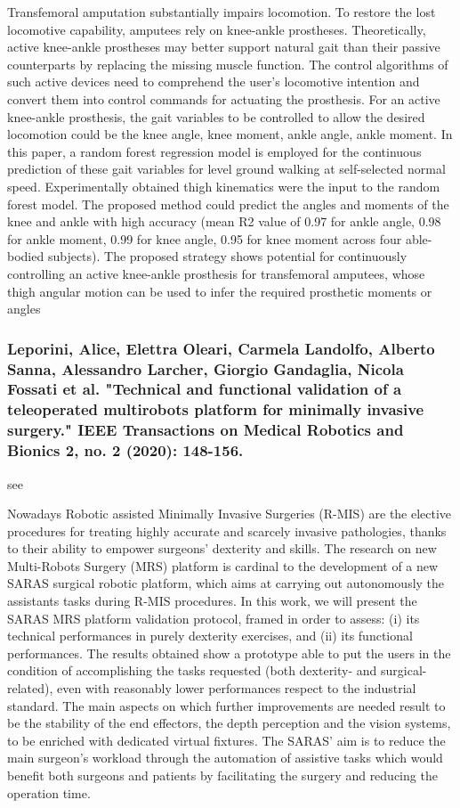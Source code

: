 \documentclass[conference]{IEEEtran}
\begin{document}
Transfemoral amputation substantially impairs locomotion. To restore the lost locomotive capability, amputees rely on knee-ankle prostheses. Theoretically, active knee-ankle prostheses may better support natural gait than their passive counterparts by replacing the missing muscle function. The control algorithms of such active devices need to comprehend the user's locomotive intention and convert them into control commands for actuating the prosthesis. For an active knee-ankle prosthesis, the gait variables to be controlled to allow the desired locomotion could be the knee angle, knee moment, ankle angle, ankle moment. In this paper, a random forest regression model is employed for the continuous prediction of these gait variables for level ground walking at self-selected normal speed. Experimentally obtained thigh kinematics were the input to the random forest model. The proposed method could predict the angles and moments of the knee and ankle with high accuracy (mean R2 value of 0.97 for ankle angle, 0.98 for ankle moment, 0.99 for knee angle, 0.95 for knee moment across four able-bodied subjects). The proposed strategy shows potential for continuously controlling an active knee-ankle prosthesis for transfemoral amputees, whose thigh angular motion can be used to infer the required prosthetic moments or angles

\medskip
\subsubsection{Leporini, Alice, Elettra Oleari, Carmela Landolfo, Alberto Sanna, Alessandro Larcher, Giorgio Gandaglia, Nicola Fossati et al. "Technical and functional validation of a teleoperated multirobots platform for minimally invasive surgery." IEEE Transactions on Medical Robotics and Bionics 2, no. 2 (2020): 148-156.}
see \cite{leporini2020technical}

Nowadays Robotic assisted Minimally Invasive Surgeries (R-MIS) are the elective procedures for treating highly accurate and scarcely invasive pathologies, thanks to their ability to empower surgeons' dexterity and skills. The research on new Multi-Robots Surgery (MRS) platform is cardinal to the development of a new SARAS surgical robotic platform, which aims at carrying out autonomously the assistants tasks during R-MIS procedures. In this work, we will present the SARAS MRS platform validation protocol, framed in order to assess: (i) its technical performances in purely dexterity exercises, and (ii) its functional performances. The results obtained show a prototype able to put the users in the condition of accomplishing the tasks requested (both dexterity- and surgical-related), even with reasonably lower performances respect to the industrial standard. The main aspects on which further improvements are needed result to be the stability of the end effectors, the depth perception and the vision systems, to be enriched with dedicated virtual fixtures. The SARAS' aim is to reduce the main surgeon's workload through the automation of assistive tasks which would benefit both surgeons and patients by facilitating the surgery and reducing the operation time.
\end{document}
